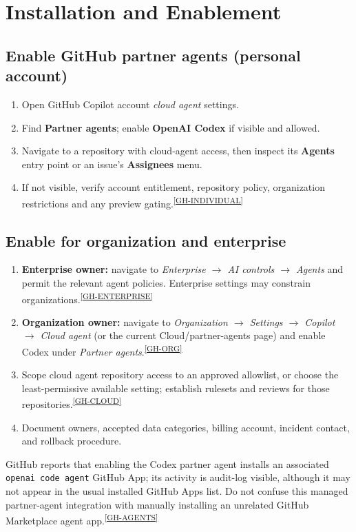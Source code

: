 \documentclass[11pt,letterpaper,oneside]{article}
\newcommand{\src}[1]{\textsuperscript{\hyperref[ref:#1]{[#1]}}}
\begin{document}
\section{Installation and Enablement}
\subsection{Enable GitHub partner agents (personal account)}
\begin{enumerate}
\item Open GitHub Copilot account \emph{cloud agent} settings.
\item Find \textbf{Partner agents}; enable \textbf{OpenAI Codex} if visible and allowed.
\item Navigate to a repository with cloud-agent access, then inspect its \textbf{Agents} entry point or an issue's \textbf{Assignees} menu.
\item If not visible, verify account entitlement, repository policy, organization restrictions and any preview gating.\src{GH-INDIVIDUAL}
\end{enumerate}

\subsection{Enable for organization and enterprise}
\begin{enumerate}
\item \textbf{Enterprise owner:} navigate to \emph{Enterprise $\rightarrow$ AI controls $\rightarrow$ Agents} and permit the relevant agent policies. Enterprise settings may constrain organizations.\src{GH-ENTERPRISE}
\item \textbf{Organization owner:} navigate to \emph{Organization $\rightarrow$ Settings $\rightarrow$ Copilot $\rightarrow$ Cloud agent} (or the current Cloud/partner-agents page) and enable Codex under \emph{Partner agents}.\src{GH-ORG}
\item Scope cloud agent repository access to an approved allowlist, or choose the least-permissive available setting; establish rulesets and reviews for those repositories.\src{GH-CLOUD}
\item Document owners, accepted data categories, billing account, incident contact, and rollback procedure.
\end{enumerate}

\begin{infobox}
GitHub reports that enabling the Codex partner agent installs an associated \texttt{openai code agent} GitHub App; its activity is audit-log visible, although it may not appear in the usual installed GitHub Apps list. Do not confuse this managed partner-agent integration with manually installing an unrelated GitHub Marketplace agent app.\src{GH-AGENTS}
\end{infobox}
\end{document}
